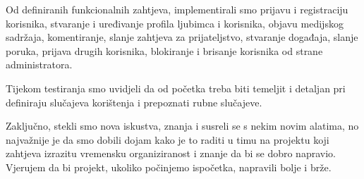 		Od definiranih funkcionalnih zahtjeva, implementirali smo prijavu i registraciju korisnika, stvaranje i uređivanje profila ljubimca i korisnika, objavu medijskog sadržaja, komentiranje, slanje zahtjeva za prijateljstvo, stvaranje događaja, slanje poruka, prijava drugih korisnika, blokiranje i brisanje korisnika od strane administratora.  
		
		Tijekom testiranja smo uvidjeli da od početka treba biti temeljit i detaljan pri definiraju slučajeva korištenja i prepoznati rubne slučajeve. 
		
		Zaključno, stekli smo nova iskustva, znanja i susreli se s nekim novim alatima, no najvažnije je da smo dobili dojam kako je to raditi u timu na projektu koji zahtjeva izrazitu vremensku organiziranost i znanje da bi se dobro napravio. Vjerujem da bi projekt, ukoliko počinjemo ispočetka, napravili bolje i brže. 
		
		\eject 